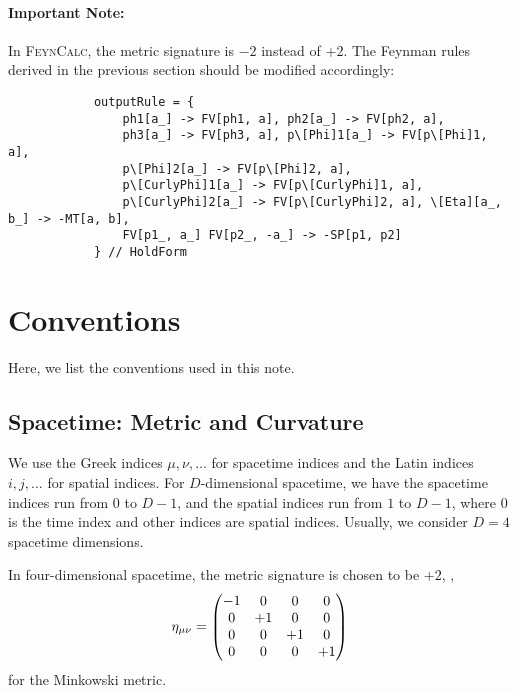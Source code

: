 \documentclass{article}
\begin{document}
        \paragraph{Important Note:}
        In \textsc{FeynCalc}, the metric signature is $-2$ instead of $+2$.
        The Feynman rules derived in the previous section should be modified accordingly:
        \begin{verbatim}
            outputRule = {
                ph1[a_] -> FV[ph1, a], ph2[a_] -> FV[ph2, a],
                ph3[a_] -> FV[ph3, a], p\[Phi]1[a_] -> FV[p\[Phi]1, a], 
                p\[Phi]2[a_] -> FV[p\[Phi]2, a], 
                p\[CurlyPhi]1[a_] -> FV[p\[CurlyPhi]1, a], 
                p\[CurlyPhi]2[a_] -> FV[p\[CurlyPhi]2, a], \[Eta][a_, b_] -> -MT[a, b], 
                FV[p1_, a_] FV[p2_, -a_] -> -SP[p1, p2]
            } // HoldForm
        \end{verbatim}

        
    
    \clearpage
    \appendix

    \section{Conventions}\label{app:convention}

        Here, we list the conventions used in this note.

        \subsection{Spacetime: Metric and Curvature}
        
            We use the Greek indices $\mu, \nu, \ldots$ for spacetime indices and the Latin indices $i, j, \ldots$ for spatial indices.
            For $D$-dimensional spacetime, we have the spacetime indices run from $0$ to $D - 1$, and the spatial indices run from $1$ to $D - 1$, where $0$ is the time index and other indices are spatial indices.
            Usually, we consider $D = 4$ spacetime dimensions.

            In four-dimensional spacetime, the metric signature is chosen to be $+2$, \eg,
            \begin{equation}
                \eta_{\mu\nu} = \mqty(\dmat[0]{-1, +1, +1, +1})
            \end{equation}
            for the Minkowski metric.
\end{document}
